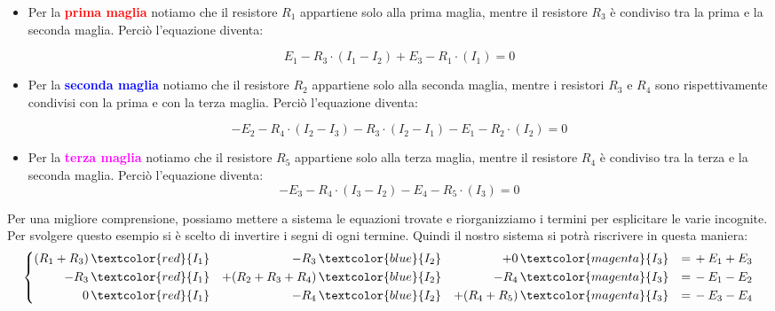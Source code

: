 \begin{itemize}
    \item Per la \textcolor{red}{\textbf{prima maglia}} notiamo che il resistore $R_1$ appartiene solo alla prima maglia, mentre il resistore $R_3$ è condiviso tra la prima e la seconda maglia. Perciò l'equazione diventa:
    
    \begin{equation}
    E_1 - R_3\cdot \left(I_1 - I_2\right) + E_3 - R_1\cdot \left(I_1\right) = 0
    \label{eq: prima_maglia_Ohm}
\end{equation}

\item Per la \textcolor{blue}{\textbf{seconda maglia}} notiamo che il resistore $R_2$ appartiene solo alla seconda maglia, mentre i resistori $R_3$ e $R_4$ sono rispettivamente condivisi con la prima e con la terza maglia. Perciò l'equazione diventa:

\begin{equation}
    - E_2 - R_4 \cdot \left(I_2 - I_3\right) - R_3 \cdot \left(I_2 - I_1\right) - E_1 - R_2 \cdot \left(I_2 \right) = 0
    \label{eq: seconda_maglia_Ohm}
\end{equation}


\item Per la \textcolor{magenta}{\textbf{terza maglia}} notiamo che il resistore $R_5$ appartiene solo alla terza maglia, mentre il resistore $R_4$ è condiviso tra la terza e la seconda maglia. Perciò l'equazione diventa:
\begin{equation}
        - E_3 - R_4\cdot\left( I_3 - I_2 \right) - E_4 - R_5\cdot \left( I_3 \right) = 0
        \label{eq: terza_maglia_Ohm}
\end{equation}
\end{itemize}


Per una migliore comprensione, possiamo mettere a sistema le equazioni trovate e riorganizziamo i termini per esplicitare le varie incognite. Per svolgere questo esempio si è scelto di invertire i segni di ogni termine.
Quindi il nostro sistema si potrà riscrivere in questa maniera:
\begin{equation}
\left\{
\begin{aligned}
(R_1 + R_3)\, &\textcolor{red}{I_1} &- R_3\, &\textcolor{blue}{I_2} &+ 0\, &\textcolor{magenta}{I_3} & = &\, + E_1 + E_3 \\
- R_3\, &\textcolor{red}{I_1} &+ (R_2 + R_3 + R_4)\, &\textcolor{blue}{I_2} &- R_4\, &\textcolor{magenta}{I_3} & = &\, - E_1 - E_2 \\
0\, &\textcolor{red}{I_1} &- R_4\, &\textcolor{blue}{I_2} &+ (R_4 + R_5)\, &\textcolor{magenta}{I_3} & = &\, - E_3 - E_4
\end{aligned}
\right.
\end{equation}


